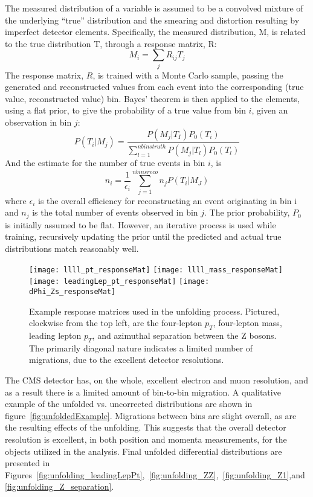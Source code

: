 The measured distribution of a variable is assumed to be a convolved mixture of
the underlying ``true'' distribution and the smearing and distortion resulting
by imperfect detector elements. Specifically, the measured distribution, M, is
related to the true distribution T, through a response matrix, R:
\begin{equation}
    M_i = \sum\limits_j R_{ij} T_j
\end{equation}
The response matrix, $R$, is trained with a Monte Carlo sample,
passing the generated and reconstructed values from each event
into the corresponding (true value, reconstructed value) bin. 
Bayes' theorem is then applied to the elements, using a flat prior, to give the
probability of a true value from bin $i$, given an observation in bin $j$:
\begin{equation}
    P(T_i | M_j) = \frac{P(M_j | T_I) P_0(T_i)}{\sum\limits_{l=1}^{nbins truth}
    P(M_j | T_l) P_0(T_l)}
\end{equation}
And the estimate for the number of true events in bin $i$, is
\begin{equation}
    n_i = \frac{1}{\epsilon_i} \sum\limits_{j=1}^{nbins reco} n_j P(T_i |
    M_J)
\end{equation}
where $\epsilon_i$ is the overall efficiency for reconstructing an event originating
in bin i and $n_j$ is the total number of events observed in bin $j$.
The prior probability, $P_0$ is initially assumed to be flat. However, an
iterative process is used while training, recursively updating the prior until
the predicted and actual true distributions match reasonably well. 

\begin{figure}[h]
\centering
\texttt{[image: llll\_pt\_responseMat]}
\texttt{[image: llll\_mass\_responseMat]} \\
\texttt{[image: leadingLep\_pt\_responseMat]}
\texttt{[image: dPhi\_Zs\_responseMat]}
\caption[Example response matrices used in unfolding.]{Example response
matrices used in the unfolding process. Pictured, clockwise from the top left,
are the four-lepton $p_T$, four-lepton mass, leading lepton $p_T$, and azimuthal
separation between the Z bosons. The primarily diagonal nature indicates a
limited number of migrations, due to the excellent detector resolutions.}
\label{fig:responseMatrices}
\end{figure}

The CMS detector has, on the whole, excellent electron and muon
resolution, and as a result there is a limited amount of bin-to-bin migration.
A qualitative example of the unfolded vs. uncorrected distributions are shown in
figure~\ref{fig:unfoldedExample}.
Migrations between bins are slight overall, as are the resulting effects of the
unfolding.
This suggests that the overall detector resolution is excellent, in both
position and momenta measurements, for the objects utilized in the analysis.
Final unfolded differential distributions are presented in
Figures~\ref{fig:unfolding_leadingLepPt},~\ref{fig:unfolding_ZZ},~\ref{fig:unfolding_Z1},and
\ref{fig:unfolding_Z_separation}.

